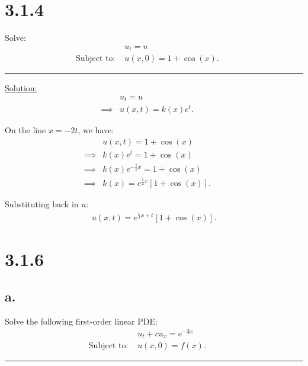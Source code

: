 \documentclass{article}
\begin{document}
\newpage

\section*{3.1.4}

Solve:
\begin{align*}
  &u_t = u &&\\
  \text{Subject to: }& u(x,0) = 1 + \cos(x).
\end{align*}

\begin{center}
  \noindent\rule{8cm}{0.4pt}
\end{center}

\underline{Solution:}
\begin{align*}
  &u_t = u &&\\
  \implies& u(x,t) = k(x)e^t.
\end{align*}

On the line $x = -2t$, we have:
\begin{align*}
  &u(x,t) = 1 + \cos(x) &&\\
  \implies& k(x)e^t = 1 + \cos(x) &&\\
  \implies& k(x)e^{-\frac{1}{2}x} = 1 + \cos(x) &&\\
  \implies& k(x) = e^{\frac{1}{2}x} \left[1 + \cos(x)\right].
\end{align*}

Substituting back in $u$:
\begin{align*}
  u(x,t) = e^{\frac{1}{2}x + t} \left[1 + \cos(x)\right].
\end{align*}

\newpage

\section*{3.1.6}
\subsection*{a.}

Solve the following first-order linear PDE:
\begin{align*}
  &u_t + c u_x= e^{-3x} &&\\
  \text{Subject to: }& u(x,0) = f(x).
\end{align*}

\begin{center}
  \noindent\rule{8cm}{0.4pt}
\end{center}
\end{document}
